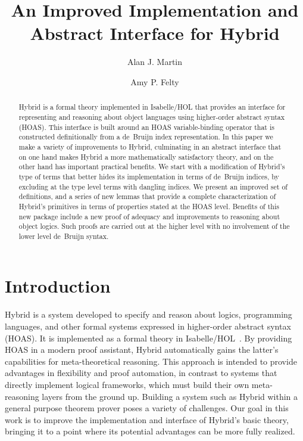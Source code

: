 \documentclass[copyright,creativecommons]{eptcs}
\title{An Improved Implementation and \titlebreak
       Abstract Interface for Hybrid}
\author{Alan J. Martin
\institute{Department of Mathematics and Statistics,\\
University of Ottawa, Canada}
\email{amart045@site.uottawa.ca}
\and
Amy P. Felty
\institute{School of Electrical Engineering and Computer Science and\\
Department of Mathematics and Statistics,\\
University of Ottawa, Canada}
\email{afelty@site.uottawa.ca}
}
\begin{document}
\maketitle

\begin{abstract}
Hybrid is a formal theory implemented in Isabelle\slash HOL that provides
an interface for representing and reasoning about object languages using
higher-order abstract syntax (HOAS).  This interface is built around an
HOAS variable-binding operator that is constructed definitionally from
a de~Bruijn index representation.  In this paper we make a variety of
improvements to Hybrid, culminating in an abstract interface that on one
hand makes Hybrid a more mathematically satisfactory theory, and on the
other hand has important practical benefits.  We start with a modification
of Hybrid's type of terms that better hides its implementation in terms
of de~Bruijn indices, by excluding at the type level terms with dangling
indices.  We present an improved set of definitions, and a series of new
lemmas that provide a complete characterization of Hybrid's primitives
in terms of properties stated at the HOAS level.  Benefits of this new
package include a new proof of adequacy and improvements to reasoning
about object logics.  Such proofs are carried out at the higher level
with no involvement of the lower level de~Bruijn syntax.
\end{abstract}


\section{Introduction}

Hybrid is a system developed to specify and reason about logics,
programming languages, and other formal systems expressed in
higher-order abstract syntax (HOAS).  It is implemented as a formal
theory in Isabelle/HOL~\cite{nipkow/paulson/wenzel:2002}.  By
providing HOAS in a modern proof assistant, Hybrid automatically gains
the latter's capabilities for meta-theoretical reasoning.  This
approach is intended to provide advantages in flexibility and proof
automation, in contrast to systems that directly implement logical
frameworks, which must build their own meta-reasoning layers from the
ground up.  Building a system such as Hybrid within a general purpose
theorem prover poses a variety of challenges.  Our goal in this work
is to improve the implementation and interface of Hybrid's basic
theory, bringing it to a point where its potential advantages can be
more fully realized.
\end{document}
